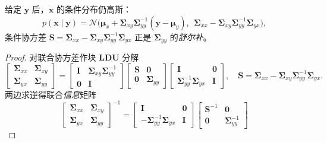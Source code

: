 \begin{theorem}\label{thm:schur-cond}
给定 $\mathbf{y}$ 后，$\mathbf{x}$ 的条件分布仍高斯：
\begin{equation}
  p(\mathbf{x}\mid\mathbf{y})=\mathcal{N}\Big(\boldsymbol{\mu}_x+\boldsymbol{\Sigma}_{xy}\boldsymbol{\Sigma}_{yy}^{-1}(\mathbf{y}-\boldsymbol{\mu}_y),\ \ \boldsymbol{\Sigma}_{xx}-\boldsymbol{\Sigma}_{xy}\boldsymbol{\Sigma}_{yy}^{-1}\boldsymbol{\Sigma}_{yx}\Big),
  \label{eq:schur-cond}
\end{equation}
条件协方差 $\mathbf{S}=\boldsymbol{\Sigma}_{xx}-\boldsymbol{\Sigma}_{xy}\boldsymbol{\Sigma}_{yy}^{-1}\boldsymbol{\Sigma}_{yx}$ 正是 $\boldsymbol{\Sigma}_{yy}$ 的\emph{舒尔补}。
\end{theorem}
\begin{proof}
对联合协方差作块 $\mathbf{LDU}$ 分解\cite{barfoot2024state}
\[
  \begin{bmatrix}\boldsymbol{\Sigma}_{xx}&\boldsymbol{\Sigma}_{xy}\\\boldsymbol{\Sigma}_{yx}&\boldsymbol{\Sigma}_{yy}\end{bmatrix}
  =\begin{bmatrix}\mathbf{I}&\boldsymbol{\Sigma}_{xy}\boldsymbol{\Sigma}_{yy}^{-1}\\\mathbf{0}&\mathbf{I}\end{bmatrix}
   \begin{bmatrix}\mathbf{S}&\mathbf{0}\\\mathbf{0}&\boldsymbol{\Sigma}_{yy}\end{bmatrix}
   \begin{bmatrix}\mathbf{I}&\mathbf{0}\\\boldsymbol{\Sigma}_{yy}^{-1}\boldsymbol{\Sigma}_{yx}&\mathbf{I}\end{bmatrix},
  \quad \mathbf{S}=\boldsymbol{\Sigma}_{xx}-\boldsymbol{\Sigma}_{xy}\boldsymbol{\Sigma}_{yy}^{-1}\boldsymbol{\Sigma}_{yx}.
\]
两边求逆得联合\emph{信息}矩阵
\[
  \begin{bmatrix}\boldsymbol{\Sigma}_{xx}&\boldsymbol{\Sigma}_{xy}\\\boldsymbol{\Sigma}_{yx}&\boldsymbol{\Sigma}_{yy}\end{bmatrix}^{-1}
  =\begin{bmatrix}\mathbf{I}&\mathbf{0}\\-\boldsymbol{\Sigma}_{yy}^{-1}\boldsymbol{\Sigma}_{yx}&\mathbf{I}\end{bmatrix}
   \begin{bmatrix}\mathbf{S}^{-1}&\mathbf{0}\\\mathbf{0}&\boldsymbol{\Sigma}_{yy}^{-1}\end{bmatrix}
\]
\end{proof}
